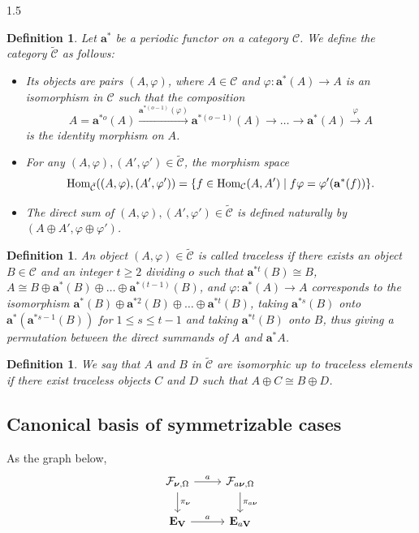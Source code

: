 \documentclass[10pt]{amsart}
\newtheorem{definition}[theorem]{Definition}
\def\Hom{\mbox{\rm Hom}}  \def\ap{\mbox{\rm ap}}
\def\bfV{{\mathbf V}}
\def\bfV{\mathbf{V}}
\def\bfE{\mathbf{E}}
\newcommand\mf{{\mathcal{F}}}
\begin{document}
\begin{spacing}{1.5}
\begin{definition}
Let $\mathbf{a}^*$ be a periodic functor on a category $\mathcal{C}$. We define the category $\tilde{\mathcal{C}}$ as follows:
\begin{itemize}
    \item[$\bullet$] Its objects are pairs $(A, \varphi)$, where $A \in \mathcal{C}$ and $\varphi: \mathbf{a}^*(A) \to A$ is an isomorphism in $\mathcal{C}$ such that the composition
    $$
    A = \mathbf{a}^{*o}(A) \xrightarrow{\mathbf{a}^{*(o-1)}(\varphi)} \mathbf{a}^{*(o-1)}(A) \to \dots \to \mathbf{a}^*(A) \xrightarrow{\varphi} A
    $$
    is the identity morphism on $A$.
    \item[$\bullet$] For any $(A, \varphi), (A', \varphi') \in \tilde{\mathcal{C}}$, the morphism space
    $$
    \Hom_{\tilde{\mathcal{C}}}((A, \varphi), (A', \varphi')) = \{ f \in \Hom_{\mathcal{C}}(A, A') \mid f\varphi = \varphi'(\mathbf{a}^*(f)) \}.
    $$
    \item[$\bullet$] The direct sum of $(A, \varphi), (A', \varphi') \in \tilde{\mathcal{C}}$ is defined naturally by $(A \oplus A', \varphi \oplus \varphi')$.
    
\end{itemize}
\end{definition}

\begin{definition}
An object $(A, \varphi) \in \tilde{\mathcal{C}}$ is called traceless if there exists an object $B \in \mathcal{C}$ and an integer $t \geqslant 2$ dividing $o$ such that $\mathbf{a}^{*t}(B) \cong B$, $A \cong B \oplus \mathbf{a}^*(B) \oplus \dots \oplus \mathbf{a}^{*(t-1)}(B)$, and $\varphi: \mathbf{a}^*(A) \to A$ corresponds to the isomorphism $\mathbf{a}^*(B) \oplus \mathbf{a}^{*2}(B) \oplus \dots \oplus \mathbf{a}^{*t}(B)$, taking $\mathbf{a}^{*s}(B)$ onto $\mathbf{a}^*(\mathbf{a}^{*s-1}(B))$ for $1 \leqslant s \leqslant t-1$ and taking $\mathbf{a}^{*t}(B)$ onto $B$, thus giving a permutation between the direct summands of $A$ and $\mathbf{a}^*A$.
\end{definition}

\begin{definition}
We say that $A$ and $B$ in $\tilde{\mathcal{C}}$ are isomorphic up to traceless elements if there exist traceless objects $C$ and $D$ such that $A \oplus C \cong B \oplus D$.
\end{definition}
\subsection{Canonical basis of symmetrizable cases}
As the graph below, 
$$\begin{tikzcd}
{\mf_{\boldsymbol{\nu},\Omega}} \arrow[r, "a"] \arrow[d, "\pi_{\boldsymbol{\nu}}"] & {\mf_{a\boldsymbol{\nu},\Omega}} \arrow[d, "\pi_{a\boldsymbol{\nu}}"] \\
\bfE_{\bfV} \arrow[r, "a"]                                                         & \bfE_{a\bfV}                                                         
\end{tikzcd}$$


\end{spacing}
\end{document}
